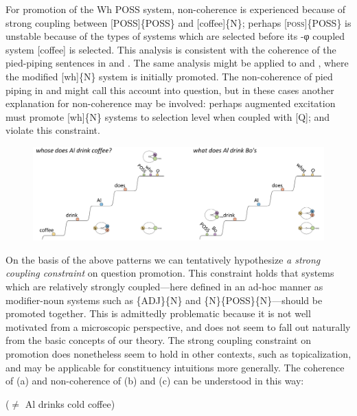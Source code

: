 For promotion of the {\textbar}Wh POSS{\textbar} system, non-coherence is experienced because of strong coupling between [POSS]\{POSS\} and [coffee]\{N\}; perhaps [\textsc{poss}]\{POSS\} is unstable because of the types of systems which are selected before its -φ coupled system [coffee] is selected. This analysis is consistent with the coherence of the pied-piping sentences in  and . The same analysis might be applied to  and , where the modified [wh]\{N\} system is initially promoted. The non-coherence of pied piping in  and  might call this account into question, but in these cases another explanation for non-coherence may be involved: perhaps augmented excitation must promote [wh]\{N\} systems to selection level when coupled with [Q];  and  violate this constraint. 

  
\begin{figure}
\includegraphics[width=\textwidth]{figures/Tilsen-img166.png}
\caption{\missingcaption}
\label{fig:}
\end{figure}
 

  On the basis of the above patterns we can tentatively hypothesize \textit{a strong coupling constraint} on question promotion. This constraint holds that systems which are relatively strongly coupled—here defined in an ad-hoc manner as modifier-noun systems such as \{ADJ\}\{N\} and \{N\}\{POSS\}\{N\}—should be promoted together. This is admittedly problematic because it is not well motivated from a microscopic perspective, and does not seem to fall out naturally from the basic concepts of our theory. The strong coupling constraint on promotion does nonetheless seem to hold in other contexts, such as topicalization, and may be applicable for constituency intuitions more generally. The coherence of (a) and non-coherence of (b) and (c) can be understood in this way:

  \ea
    (${\neq}$ Al drinks cold coffee)
  \z
  \z
  
